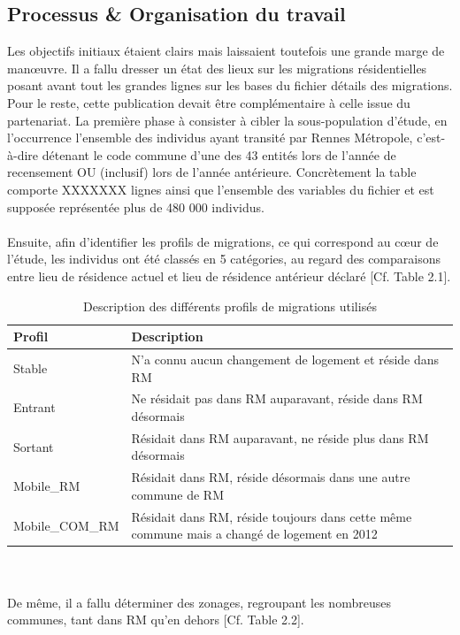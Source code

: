 \documentclass{bredele}
\begin{document}
\subsection{Processus \& Organisation du travail}
Les objectifs initiaux étaient clairs mais laissaient toutefois une grande marge de manœuvre. Il a fallu dresser un état des lieux sur les migrations résidentielles posant avant tout les grandes lignes sur les bases du fichier détails des migrations. Pour le reste, cette publication devait être complémentaire à celle issue du partenariat.
La première phase à consister à cibler la sous-population d’étude, en l’occurrence l’ensemble des individus ayant transité par Rennes Métropole, c'est-à-dire détenant le code commune d’une des 43 entités lors de l’année de recensement OU (inclusif) lors de l’année antérieure. Concrètement la table comporte XXXXXXX lignes ainsi que l’ensemble des variables du fichier et est supposée représentée plus de 480 000 individus.
\\\\Ensuite, afin d’identifier les profils de migrations, ce qui correspond au cœur de l’étude, les individus ont été classés en 5 catégories, au regard des comparaisons entre lieu de résidence actuel et lieu de résidence antérieur déclaré [Cf. Table 2.1].
\newpage
\begin{table}
\begin{tabular}{ | l | p{12cm}| }
 \hline \large{Profil} & \large{Description} \\
 \hline Stable & \small{N’a connu aucun changement de logement et réside dans RM}\\
 \hline Entrant & \small{Ne résidait pas dans RM auparavant, réside dans RM désormais}  \\
 \hline Sortant & \small{Résidait dans RM auparavant, ne réside plus dans RM désormais}\\
 \hline Mobile\_RM & \small{Résidait dans RM, réside désormais dans une autre commune de RM}\\
 \hline Mobile\_COM\_RM & \small{Résidait dans RM, réside toujours dans cette même commune mais a changé de logement en 2012}\\ \hline
 \end{tabular}
\caption{Description des différents profils de migrations utilisés}
\end{table}
\\\\De même, il a fallu déterminer des zonages, regroupant les nombreuses communes, tant dans RM qu’en dehors [Cf. Table 2.2].
\end{document}

